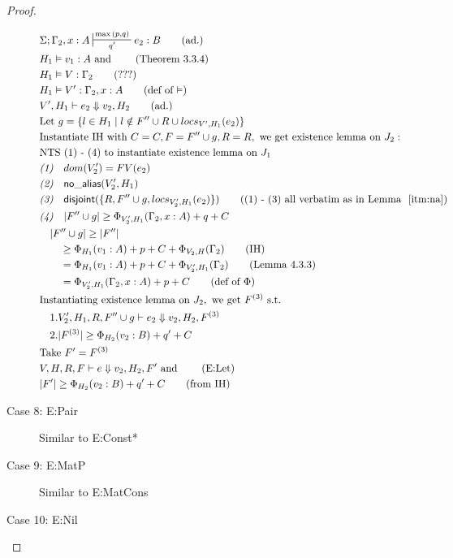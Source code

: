 \documentclass[11pt]{article}
\newcommand{\na}[1]{\mathsf{no\_alias}(#1)}
\newcommand{\dist}[1]{\mathsf{disjoint}(#1)}
\theoremstyle{definition}
\begin{document}
\begin{proof}
\begin{description}
\begin{align*}
  &\Sigma; \Gamma_2, x : A \sststile{q'}{\max{(p,q)}} e_2 : B \tag{ad.}\\
  &H_1 \vDash v_1 : A \text{ and } \tag{Theorem 3.3.4}\\ 
  &H_1 \vDash V : \Gamma_2 \tag{???}\\
  &H_1 \vDash V' : \Gamma_2, x : A \tag{def of $\vDash$}\\
  &V',H_1 \vdash e_2 \Downarrow v_2,H_2 \tag{ad.}\\
  &\text{Let } g = \{l \in H_1 \mid l \notin F'' \cup R \cup locs_{V',H_1}(e_2)\}\\ 
  &\text{Instantiate IH with } C = C, F = F'' \cup g, R = R, \text{ we get existence lemma on  } J_2:\\
  &\text{NTS (1) - (4) to instantiate existence lemma on } J_1\\
  &\emph{(1)} \quad dom(V_2') = FV(e_2)\\
  &\emph{(2)} \quad \na{V_2',H_1} \\
  &\emph{(3)} \quad \dist{\{R,F'' \cup g,locs_{V_2',H_1}(e_2)\}} \tag{(1) - (3) all verbatim as in Lemma $~\ref{itm:na}$}\\
  &\emph{(4)} \quad |F'' \cup g| \ge \Phi_{V_2',H_1}(\Gamma_2,x:A) + q + C\\
  &\quad |F'' \cup g | \ge |F''|\\
  &\quad \quad \ge \Phi_{H_1}(v_1:A) + p + C + \Phi_{V_2,H}(\Gamma_2) \tag{IH}\\ 
  &\quad \quad = \Phi_{H_1}(v_1:A) + p + C + \Phi_{V_2',H_1}(\Gamma_2) \tag{Lemma 4.3.3}\\ 
  &\quad \quad = \Phi_{V_2',H_1}(\Gamma_2,x:A) + p + C \tag{def of $\Phi$}\\
  &\text{Instantiating existence lemma on } J_2, \text{ we get } F^{(3)} \text{ s.t. }\\
  &\quad 1. V_2',H_1,R, F'' \cup g \vdash e_2 \Downarrow v_2,H_2,F^{(3)} \\
  &\quad 2. |F^{(3)}| \ge \Phi_{H_2}(v_2:B) + q' + C\\
  &\text{Take } F' = F^{(3)}\\
  &V,H,R,F \vdash e \Downarrow v_2, H_2,F' \text{ and } \tag{E:Let}\\ 
  &|F'| \ge \Phi_{H_2}(v_2:B) + q' + C \tag{from IH}\\
  \end{align*}
  \item[Case 8: E:Pair]
  Similar to E:Const*
  \item[Case 9: E:MatP]
  Similar to E:MatCons
  \item[Case 10: E:Nil]

\end{description}
\end{proof}
\end{document}
